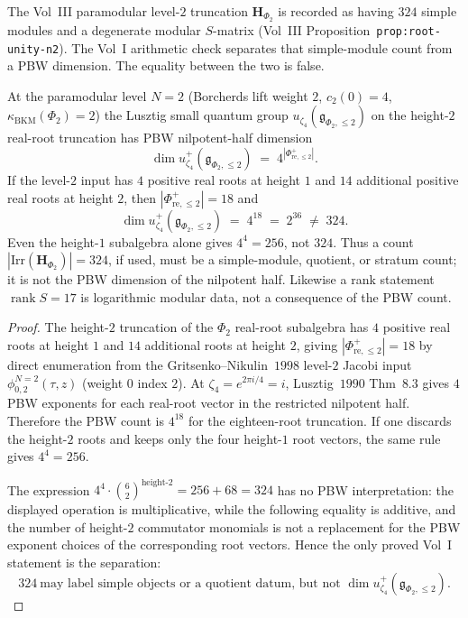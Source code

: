 The Vol~III paramodular level-$2$ truncation $\mathbf H_{\Phi_2}$
is recorded as having $324$ simple modules and a degenerate modular
$S$-matrix (Vol~III Proposition~\texttt{prop:root-unity-n2}). The
Vol~I arithmetic check separates that simple-module count from a PBW
dimension. The equality between the two is false.

\begin{theorem}[$N = 2$ root-of-unity: $324$ is not a PBW dimension;
\ClaimStatusProvedHere]
\label{thm:n-2-root-unity-vol-I-face}
%
%
At the paramodular level $N = 2$ (Borcherds lift weight $2$,
$c_2(0) = 4$, $\kappa_{\mathrm{BKM}}(\Phi_2) = 2$) the Lusztig
small quantum group $u_{\zeta_4}(\mathfrak g_{\Phi_2, \le 2})$ on
the height-$2$ real-root truncation has PBW nilpotent-half dimension
\begin{equation}\label{eq:n2-nilpotent-half-324}
 \dim u_{\zeta_4}^+(\mathfrak g_{\Phi_2, \le 2})
 \;=\;
 4^{|\Phi^+_{\mathrm{re},\le2}|}.
\end{equation}
If the level-$2$ input has $4$ positive real roots at height $1$
and $14$ additional positive real roots at height $2$, then
$|\Phi^+_{\mathrm{re},\le2}|=18$ and
\begin{equation}\label{eq:n2-pbw-not-324}
 \dim u_{\zeta_4}^+(\mathfrak g_{\Phi_2, \le 2})
 \;=\;
 4^{18}
 \;=\;
 2^{36}
 \;\neq\;
 324.
\end{equation}
Even the height-$1$ subalgebra alone gives $4^4=256$, not $324$.
Thus a count $|\mathrm{Irr}(\mathbf H_{\Phi_2})|=324$, if used,
must be a simple-module, quotient, or stratum count; it is not the
PBW dimension of the nilpotent half. Likewise a rank statement
$\operatorname{rank}S=17$ is logarithmic modular data, not a
consequence of the PBW count.
\end{theorem}

\begin{proof}
The height-$2$ truncation of the $\Phi_2$ real-root subalgebra
has $4$ positive real roots at height $1$ and $14$ additional
roots at height $2$, giving $|\Phi^+_{\mathrm{re}, \le 2}| = 18$
by direct enumeration from the Gritsenko--Nikulin~$1998$ level-$2$
Jacobi input $\phi_{0, 2}^{N = 2}(\tau, z)$ (weight $0$ index $2$).
At $\zeta_4 = e^{2\pi i/4} = i$, Lusztig~$1990$ Thm~$8.3$ gives
$4$ PBW exponents for each real-root vector in the restricted
nilpotent half. Therefore the PBW count is $4^{18}$ for the
eighteen-root truncation. If one discards the height-$2$ roots and
keeps only the four height-$1$ root vectors, the same rule gives
$4^4=256$.

The expression
$4^4\cdot\binom{6}{2}^{\mathrm{height}\text{-}2}=256+68=324$
has no PBW interpretation: the displayed operation is
multiplicative, while the following equality is additive, and the
number of height-$2$ commutator monomials is not a replacement for
the PBW exponent choices of the corresponding root vectors. Hence the
only proved Vol~I statement is the separation:
\[
 324\ \text{may label simple objects or a quotient datum, but not }
 \dim u_{\zeta_4}^+(\mathfrak g_{\Phi_2,\le2}).
\]
\end{proof}

